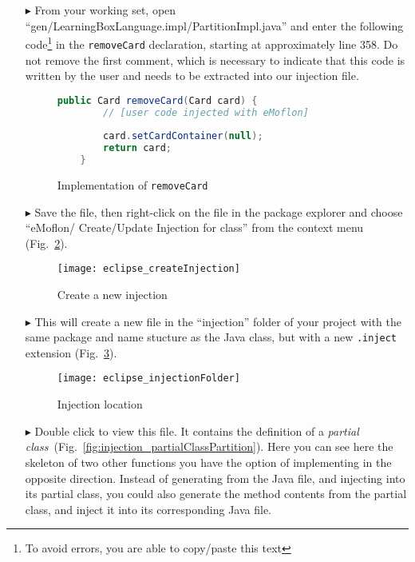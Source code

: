 \begin{itemize}


\item[$\blacktriangleright$] From your working set, open ``gen/LearningBoxLanguage.impl/PartitionImpl.java'' and enter the following code\footnote{To avoid
errors, you are able to copy/paste this text} in the \texttt{removeCard} declaration, starting at approximately line 358. Do not remove the first comment,
which is necessary to indicate that this code is written by the user and needs to be extracted into our injection file.

\begin{figure}[htbp]
        \centering
        \begin{lstlisting}[language=Java, keywordstyle={\bfseries\color{purple}}, backgroundcolor=\color{white}]
    public Card removeCard(Card card) {
        // [user code injected with eMoflon]
        
        card.setCardContainer(null);
        return card;
    }
        \end{lstlisting}
        \caption{Implementation of \texttt{removeCard}}
        \label{fig:addToStringRep_impl}
\end{figure}

\item[$\blacktriangleright$] Save the file, then right-click on the file in the package explorer and choose ``eMoflon/ Create/Update Injection for class'' from
the context menu (Fig.~\ref{fig:injection_create_injection}).

\begin{figure}[htbp]
    \centering
    \texttt{[image: eclipse\_createInjection]}
    \caption{Create a new injection}
    \label{fig:injection_create_injection}
\end{figure}
    
\item[$\blacktriangleright$] This will create a new file in the ``injection'' folder of your project with the same package and name stucture as the Java class,
but with a new \texttt{.inject} extension (Fig.~\ref{fig:injection_folder}).

\begin{figure}[htbp]
    \centering
    \texttt{[image: eclipse\_injectionFolder]}
    \caption{Injection location}
    \label{fig:injection_folder}
\end{figure}

\item[$\blacktriangleright$] Double click to view this file. It contains the definition of a \textit{partial
class}~(Fig.~\ref{fig:injection_partialClassPartition}). Here you can see here the skeleton of two other functions you have the option of implementing in the
opposite direction. Instead of generating from the Java file, and injecting into its partial class, you could also generate the method contents from the
partial class, and inject it into its corresponding Java file.


\end{itemize}
